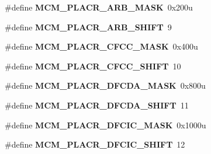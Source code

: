 \begin{DoxyCompactItemize}
\item 
\hypertarget{group___m_c_m___register___masks_gaeea6e96c143304d5bb05ea7fc403efc3}{}\#define {\bfseries M\+C\+M\+\_\+\+P\+L\+A\+C\+R\+\_\+\+A\+R\+B\+\_\+\+M\+A\+S\+K}~0x200u\label{group___m_c_m___register___masks_gaeea6e96c143304d5bb05ea7fc403efc3}

\item 
\hypertarget{group___m_c_m___register___masks_ga074aa7cf18e97a20994af9c9f1151873}{}\#define {\bfseries M\+C\+M\+\_\+\+P\+L\+A\+C\+R\+\_\+\+A\+R\+B\+\_\+\+S\+H\+I\+F\+T}~9\label{group___m_c_m___register___masks_ga074aa7cf18e97a20994af9c9f1151873}

\item 
\hypertarget{group___m_c_m___register___masks_gacbfd3b84d50859b667b4c8c8923893c6}{}\#define {\bfseries M\+C\+M\+\_\+\+P\+L\+A\+C\+R\+\_\+\+C\+F\+C\+C\+\_\+\+M\+A\+S\+K}~0x400u\label{group___m_c_m___register___masks_gacbfd3b84d50859b667b4c8c8923893c6}

\item 
\hypertarget{group___m_c_m___register___masks_ga278b7f999d641bc9c3ab1c7c6d28e8cb}{}\#define {\bfseries M\+C\+M\+\_\+\+P\+L\+A\+C\+R\+\_\+\+C\+F\+C\+C\+\_\+\+S\+H\+I\+F\+T}~10\label{group___m_c_m___register___masks_ga278b7f999d641bc9c3ab1c7c6d28e8cb}

\item 
\hypertarget{group___m_c_m___register___masks_gae6459088afbbf9bcb5bf4e5eb88f239c}{}\#define {\bfseries M\+C\+M\+\_\+\+P\+L\+A\+C\+R\+\_\+\+D\+F\+C\+D\+A\+\_\+\+M\+A\+S\+K}~0x800u\label{group___m_c_m___register___masks_gae6459088afbbf9bcb5bf4e5eb88f239c}

\item 
\hypertarget{group___m_c_m___register___masks_ga9834def64562d8851ba0500d81ae2a16}{}\#define {\bfseries M\+C\+M\+\_\+\+P\+L\+A\+C\+R\+\_\+\+D\+F\+C\+D\+A\+\_\+\+S\+H\+I\+F\+T}~11\label{group___m_c_m___register___masks_ga9834def64562d8851ba0500d81ae2a16}

\item 
\hypertarget{group___m_c_m___register___masks_ga4a3f9ffb612145266536e0de8e9fa432}{}\#define {\bfseries M\+C\+M\+\_\+\+P\+L\+A\+C\+R\+\_\+\+D\+F\+C\+I\+C\+\_\+\+M\+A\+S\+K}~0x1000u\label{group___m_c_m___register___masks_ga4a3f9ffb612145266536e0de8e9fa432}

\item 
\hypertarget{group___m_c_m___register___masks_gaff851bbdb5438d7e6c4816866107aec0}{}\#define {\bfseries M\+C\+M\+\_\+\+P\+L\+A\+C\+R\+\_\+\+D\+F\+C\+I\+C\+\_\+\+S\+H\+I\+F\+T}~12\label{group___m_c_m___register___masks_gaff851bbdb5438d7e6c4816866107aec0}


\end{DoxyCompactItemize}
